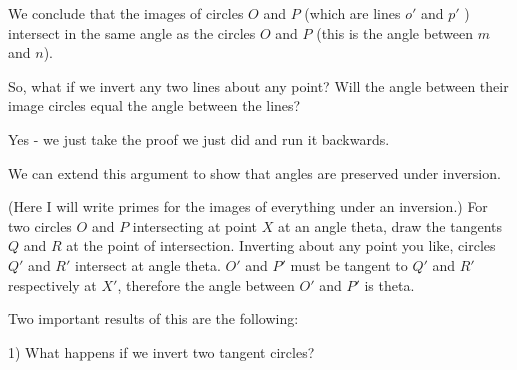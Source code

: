 

We conclude that the images of circles $O$ and $P$ (which are lines $o'$ and $p'$ ) intersect in the same angle as the circles $O$ and $P$ (this is the angle between $m$ and $n$).

So, what if we invert any two lines about any point?  Will the angle between their image circles equal the angle between the lines?




Yes - we just take the proof we just did and run it backwards.

We can extend this argument to show that angles are preserved under inversion.

(Here I will write primes for the images of everything under an inversion.)  For two circles $O$ and $P$ intersecting at point $X$ at an angle theta, draw the tangents $Q$ and $R$ at the point of intersection.  Inverting about any point you like, circles $Q'$ and $R'$ intersect at angle theta.  $O'$ and $P'$ must be tangent to $Q'$ and $R'$ respectively at $X'$, therefore the angle between $O'$ and $P'$ is theta.

Two important results of this are the following:

1) What happens if we invert two tangent circles?





